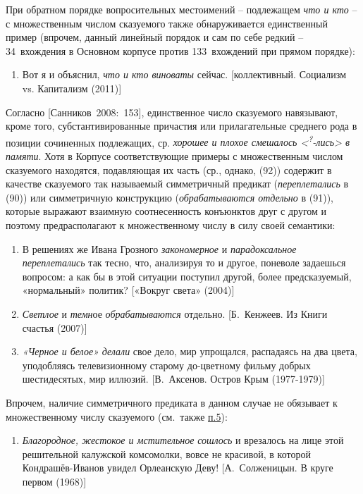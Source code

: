 При обратном порядке вопросительных местоимений -- подлежащем \emph{что
и кто} -- с множественным числом сказуемого также обнаруживается
единственный пример (впрочем, данный линейный порядок и сам по себе
редкий -- 34~вхождения в Основном корпусе против 133~вхождений при
прямом порядке):

\begin{enumerate}
\def\labelenumi{(\arabic{enumi})}
\setcounter{enumi}{88}
\item
  Вот я и объяснил, \emph{что и кто виноваты} сейчас. {[}коллективный.
  Социализм vs. Капитализм (2011){]}
\end{enumerate}

Согласно {[}Санников~2008:~153{]}, единственное число сказуемого
навязывают, кроме того, субстантивированные причастия или прилагательные
среднего рода в позиции сочиненных подлежащих, ср. \emph{хорошее и
плохое смешалось \textless{}\textsuperscript{?}-лись\textgreater{} в
памяти}. Хотя в Корпусе соответствующие примеры с множественным числом
сказуемого находятся, подавляющая их часть (ср., однако, (92)) содержит
в качестве сказуемого так называемый симметричный предикат
(\emph{переплетались} в (90)) или симметричную конструкцию
(\emph{обрабатываются отдельно} в (91)), которые выражают взаимную
соотнесенность конъюнктов друг с другом и поэтому предрасполагают к
множественному числу в силу своей семантики:

\begin{enumerate}
\def\labelenumi{(\arabic{enumi})}
\setcounter{enumi}{89}
\item
  В решениях же Ивана Грозного \emph{закономерное} и
  \emph{парадоксальное} \emph{переплетались} так тесно, что, анализируя
  то и другое, поневоле задаешься вопросом: а как бы в этой ситуации
  поступил другой, более предсказуемый, «нормальный» политик? {[}«Вокруг
  света» (2004){]}
\item
  \emph{Светлое} и \emph{темн}ое \emph{обрабатываются} отдельно.
  {[}Б.~Кенжеев. Из Книги счастья (2007){]}
\item
  \emph{«Черное и белое»} \emph{делали} свое дело, мир упрощался,
  распадаясь на два цвета, уподобляясь телевизионному старому
  до-цветному фильму добрых шестидесятых, мир иллюзий. {[}В.~Аксенов.
  Остров Крым (1977-1979){]}
\end{enumerate}

Впрочем, наличие симметричного предиката в данном случае не обязывает к
множественному числу сказуемого (см.~также \underline{п.5}):

\begin{enumerate}
\def\labelenumi{(\arabic{enumi})}
\setcounter{enumi}{92}
\item
  \emph{Благородное, жестокое и мстительное} \emph{сошлось} и врезалось
  на лице этой решительной калужской комсомолки, вовсе не красивой, в
  которой Кондрашёв-Иванов увидел Орлеанскую Деву! {[}А.~Солженицын. В
  круге первом (1968){]}
\end{enumerate}

